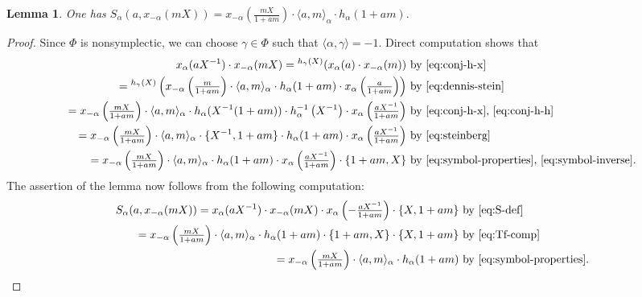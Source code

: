 \documentclass[oneside, 8pt]{amsart}
\newtheorem{lemma}{Lemma}
\theoremstyle{remark}
\theoremstyle{definition}
\numberwithin{lemma}{section}
\numberwithin{prop}{section}
\numberwithin{corollary}{section}
\numberwithin{externaltheorem}{section}
\numberwithin{equation}{section}
\begin{document}
\begin{lemma} \label{lem:Tulenbaev-formula} 
One has $S_\alpha(a, x_{-\alpha}(mX)) = x_{-\alpha}\left(\tfrac{mX}{1+am}\right) \cdot \langle a, m\rangle_\alpha \cdot h_\alpha(1+am).$
\end{lemma}
\begin{proof} Since $\Phi$ is nonsymplectic, we can choose $\gamma \in \Phi$ such that $\langle \alpha, \gamma \rangle = -1$. Direct computation shows that
 \begin{align} 
 x_\alpha(aX^{-1}) \cdot x_{-\alpha}(mX) = {}^{h_\gamma(X)}(x_\alpha(a) \cdot x_{-\alpha}(m)) &\text{ by~\eqref{eq:conj-h-x}} \label{eq:Tf-comp} \\
 = {}^{h_\gamma(X)}\left( x_{-\alpha}\left(\tfrac{m}{1+am}\right) \cdot \langle a, m\rangle_\alpha \cdot h_\alpha(1+am) \cdot x_\alpha\left(\tfrac{a}{1+am}\right) \right) &\text{ by~\eqref{eq:dennis-stein}} \nonumber \\
 = x_{-\alpha}\left(\tfrac{mX}{1+am}\right) \cdot \langle a, m\rangle_\alpha \cdot h_\alpha(X^{-1}(1+am))\cdot h_\alpha^{-1}\left(X^{-1}\right) \cdot x_{\alpha}\left(\tfrac{aX^{-1}}{1+am}\right) &\text{ by~\eqref{eq:conj-h-x}, \eqref{eq:conj-h-h}} \nonumber \\
 = x_{-\alpha}\left(\tfrac{mX}{1+am}\right) \cdot \langle a, m\rangle_\alpha \cdot \{X^{-1}, 1+am\} \cdot h_\alpha(1+am)\cdot x_{\alpha}\left(\tfrac{aX^{-1}}{1+am}\right)&\text{ by~\eqref{eq:steinberg}} \nonumber \\
 = x_{-\alpha}\left(\tfrac{mX}{1+am}\right) \cdot \langle a, m\rangle_\alpha \cdot h_\alpha(1+am) \cdot x_{\alpha}\left(\tfrac{aX^{-1}}{1+am}\right) \cdot \{1+am, X\}&\text{ by~\eqref{eq:symbol-properties}, \eqref{eq:symbol-inverse}}. \nonumber \end{align}
The assertion of the lemma now follows from the following computation:
\begin{align*}
 S_\alpha(a, x_{-\alpha}(mX)) = x_\alpha(aX^{-1})\cdot x_{-\alpha}(mX) \cdot x_\alpha\left(-\tfrac{aX^{-1}}{1 + am}\right) \cdot \{X, 1+ am\} &\text{ by~\eqref{eq:S-def}} \\
 = x_{-\alpha}\left(\tfrac{mX}{1+am}\right) \cdot \langle a, m\rangle_\alpha \cdot h_\alpha(1+am) \cdot \{1+am, X\} \cdot \{X, 1+ am\}&\text{ by~\eqref{eq:Tf-comp}} \\
 = x_{-\alpha}\left(\tfrac{mX}{1+am}\right) \cdot \langle a, m\rangle_\alpha \cdot h_\alpha(1+am) &\text{ by~\eqref{eq:symbol-properties}}. \qedhere\end{align*}  \end{proof}
\end{document}

